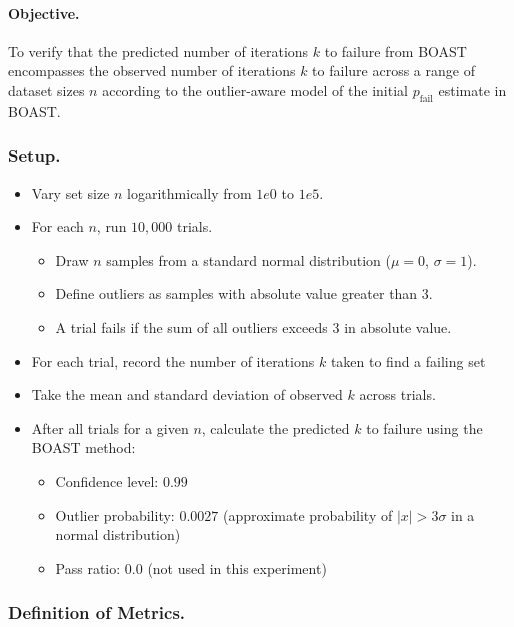     \paragraph{Objective.}
    To verify that the predicted number of iterations $k$ to failure from BOAST encompasses the observed number of iterations $k$ to 
    failure across a range of dataset sizes $n$ according to the outlier-aware model of the initial $p_\text{fail}$ estimate in BOAST.

    \subsubsection{Setup.}

        \begin{itemize}
            \item Vary set size $n$ logarithmically from $1e0$ to $1e5$.
            \item For each $n$, run $10{,}000$ trials.
            \begin{itemize}
                \item Draw $n$ samples from a standard normal distribution ($\mu=0$, $\sigma=1$).  
                \item Define outliers as samples with absolute value greater than $3$.  
                \item A trial fails if the sum of all outliers exceeds $3$ in absolute value.  
            \end{itemize}
            \item For each trial, record the number of iterations $k$ taken to find a failing set  
            \item Take the mean and standard deviation of observed $k$ across trials.
            \item After all trials for a given $n$, calculate the predicted $k$ to failure using the BOAST method:
            \begin{itemize}
                \item Confidence level: $0.99$  
                \item Outlier probability: $0.0027$ (approximate probability of $|x| > 3\sigma$ in a normal distribution)  
                \item Pass ratio: $0.0$ (not used in this experiment)
            \end{itemize}
        \end{itemize}

    \subsubsection{Definition of Metrics.}

